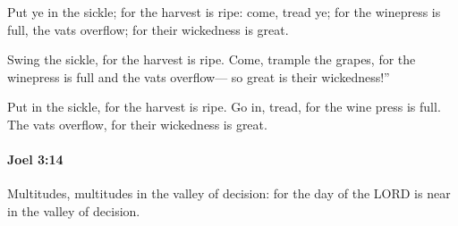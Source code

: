 			\begin{versebox}
					\item[BHS] 
					\item[LXX] 
					\item[ASV] Put ye in the sickle; for the harvest is ripe: come, tread ye; for the winepress is full, the vats overflow; for their wickedness is great.
					\item[NIV] Swing the sickle, for the harvest is ripe. Come, trample the grapes, for the winepress is full and the vats overflow— so great is their wickedness!”
					\item[NRSV] Put in the sickle, for the harvest is ripe. Go in, tread, for the wine press is full. The vats overflow, for their wickedness is great.
			\end{versebox}

		\paragraph{Joel 3:14} %
			\label{JOEL-3-14}

			Multitudes, multitudes in the valley of decision: for the day of the LORD is near in the valley of decision.

